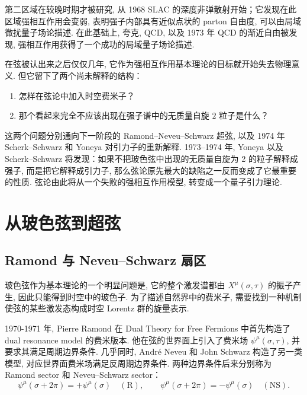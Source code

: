 \documentclass[10pt]{article}
\numberwithin{equation}{section}
\begin{document}
第二区域在较晚时期才被研究, 从 1968 SLAC 的深度非弹散射开始；它发现在此区域强相互作用会变弱, 表明强子内部具有近似点状的 parton 自由度, 可以由局域微扰量子场论描述. 在此基础上, 夸克, QCD, 以及 1973 年 QCD 的渐近自由被发现, 强相互作用获得了一个成功的局域量子场论描述\cite{BloomEtAl1969,BreidenbachEtAl1969,GrossWilczek1973,Politzer1973}. 

在弦被认出来之后仅仅几年, 它作为强相互作用基本理论的目标就开始失去物理意义. 但它留下了两个尚未解释的结构：
\begin{enumerate}
  \item 怎样在弦论中加入时空费米子？
  \item 那个看起来完全不应该出现在强子谱中的无质量自旋 $2$ 粒子是什么？
\end{enumerate}

这两个问题分别通向下一阶段的 Ramond–Neveu–Schwarz 超弦, 以及 1974 年 Scherk–Schwarz 和 Yoneya 对引力子的重新解释. 1973–1974 年, Yoneya 以及 Scherk–Schwarz 将发现：如果不把玻色弦中出现的无质量自旋为 2 的粒子解释成强子, 而是把它解释成引力子, 那么弦论原先最大的缺陷之一反而变成了它最重要的性质. 弦论由此将从一个失败的强相互作用模型, 转变成一个量子引力理论\cite{ScherkSchwarz1974,Yoneya1974}. 

\section{从玻色弦到超弦}

\subsection{Ramond 与 Neveu–Schwarz 扇区}

玻色弦作为基本理论的一个明显问题是, 它的整个激发谱都由 $X^\mu(\sigma,\tau)$ 的振子产生, 因此只能得到时空中的玻色子. 为了描述自然界中的费米子, 需要找到一种机制使弦的某些激发态构成时空 Lorentz 群的旋量表示. 

1970-1971 年, Pierre Ramond 在 Dual Theory for Free Fermions 中首先构造了 dual resonance model 的费米版本. 他在弦的世界面上引入了费米场 $\psi^\mu(\sigma,\tau)$, 并要求其满足周期边界条件. 几乎同时, André Neveu 和 John Schwarz 构造了另一类模型, 对应世界面费米场满足反周期边界条件. 两种边界条件后来分别称为 Ramond sector 和 Neveu–Schwarz sector\cite{Ramond1971,NeveuSchwarz1971}：
\begin{equation} 
\psi^\mu (\sigma+2\pi)=+\psi^\mu (\sigma)\quad (\mathrm R),\qquad \psi^\mu (\sigma+2\pi)=-\psi^\mu (\sigma)\quad (\mathrm{NS}).
\end{equation}
\end{document}
